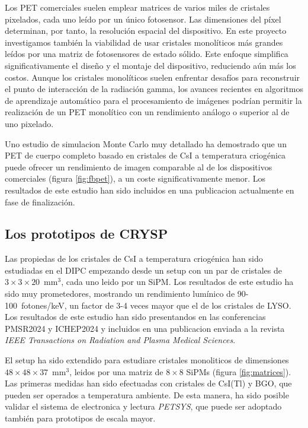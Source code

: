 \documentclass[12pt,a4paper,article]{report} %
\def\crysp{{\bf CRYSP }}
\begin{document}
Los PET comerciales suelen emplear matrices de varios miles de cristales pixelados, cada uno leído por un único fotosensor. Las dimensiones del píxel determinan, por tanto, la resolución espacial del dispositivo. En este proyecto investigamos también la viabilidad de usar cristales monolíticos más grandes leídos por una matriz de fotosensores de estado sólido. Este enfoque simplifica significativamente el diseño y el montaje del dispositivo, reduciendo aún más los costos. Aunque los cristales monolíticos suelen enfrentar desafíos para reconstruir el punto de interacción de la radiación gamma, los avances recientes en algoritmos de aprendizaje automático para el procesamiento de imágenes podrían permitir la realización de un PET monolítico con un rendimiento análogo o superior al de uno pixelado.



Uno estudio de simulacion Monte Carlo muy detallado ha demostrado que un PET de cuerpo completo basado en cristales de CsI a temperatura criogénica puede ofrecer un rendimiento de imagen comparable al de los dispositivos comerciales (figura \ref{fig:fbpet}), a un coste significativamente menor. Los resultados de este estudio han sido incluidos en una publicacion actualmente en fase de finalización.



\subsection*{Los prototipos de \crysp}

Las propiedas de los cristales de CsI a temperatura criogénica han sido estudiadas en el DIPC empezando desde un setup con un par de cristales de $3\times3\times20$~mm$^3$, cada uno leido por un SiPM. Los resultados de este estudio ha sido muy prometedores, mostrando un rendimiento lumínico de 90-100~fotones/keV, un factor de 3-4 veces mayor que el de los cristales de LYSO. Los resultados de este estudio han sido presentandos en las conferencias PMSR2024 y ICHEP2024 y incluidos en una publicacion enviada a la revista \emph{IEEE Transactions on Radiation and Plasma Medical Sciences}.

El setup ha sido extendido para estudiare cristales monoliticos de dimensiones $48\times48\times37$~mm$^3$, leidos por una matriz de $8\times8$ SiPMs (figura \ref{fig:matrices}). Las primeras medidas han sido efectuadas con cristales de CsI(Tl) y BGO, que pueden ser operados a temperatura ambiente. De esta manera, ha sido posible validar el sistema de electronica y lectura \emph{PETSYS}, que puede ser adoptado también para prototipos de escala mayor.
\end{document}
